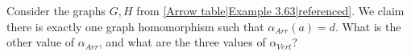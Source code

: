 
Consider the graphs $G,H$ from \ref{Arrow table|Example 3.63|referenced}. We claim there is exactly one graph homomorphism such that $\alpha_{Arr}(a)=d$. What is the other value of $\alpha_{Arr}$, and what are the three values of $\alpha_{Vert}$?
